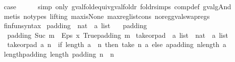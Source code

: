 \begin{isabellebody}
\ {\isacharquery}case\isanewline
\ \ \ \ \isamarkupfalse%
\ {\isacharparenleft}simp\ only{\isacharcolon}\ gval{\isacharunderscore}fold{\isacharunderscore}equiv{\isacharunderscore}gval{\isacharunderscore}foldr\ foldr{\isachardot}simps\ comp{\isacharunderscore}def\ gval{\isacharunderscore}gAnd{\isacharparenright}\isanewline
\ \ \ \ \isamarkupfalse%
\ {\isacharparenleft}metis\ {\isacharparenleft}no{\isacharunderscore}types{\isacharcomma}\ lifting{\isacharparenright}\ max{\isacharunderscore}is{\isacharunderscore}None\ max{\isacharunderscore}reg{\isacharunderscore}list{\isacharunderscore}cons\ no{\isacharunderscore}reg{\isacharunderscore}gval{\isacharunderscore}swap{\isacharunderscore}regs{\isacharparenright}\isanewline
{}\isamarkupfalse%
%
\endisatagproof
{\isafoldproof}%
%
\isadelimproof
\isanewline
%
\endisadelimproof
\isanewline
{}\isamarkupfalse%
\ finfun{\isacharunderscore}syntax\isanewline
\isanewline
{}\isamarkupfalse%
\ padding\ {\isacharcolon}{\isacharcolon}\ {\isachardoublequoteopen}nat\ {\isasymRightarrow}\ {\isacharprime}a\ list{\isachardoublequoteclose}\ \isanewline
\ \ {\isachardoublequoteopen}padding\ {}\ {\isacharequal}\ {\isacharbrackleft}{\isacharbrackright}{\isachardoublequoteclose}\ {\isacharbar}\isanewline
\ \ {\isachardoublequoteopen}padding\ {\isacharparenleft}Suc\ m{\isacharparenright}\ {\isacharequal}\ {\isacharparenleft}Eps\ {\isacharparenleft}{\isasymlambda}x{\isachardot}\ True{\isacharparenright}{\isacharparenright}{\isacharhash}{\isacharparenleft}padding\ m{\isacharparenright}{\isachardoublequoteclose}\isanewline
\isanewline
{}\isamarkupfalse%
\ take{\isacharunderscore}or{\isacharunderscore}pad\ {\isacharcolon}{\isacharcolon}\ {\isachardoublequoteopen}{\isacharprime}a\ list\ {\isasymRightarrow}\ nat\ {\isasymRightarrow}\ {\isacharprime}a\ list{\isachardoublequoteclose}\ \isanewline
\ \ {\isachardoublequoteopen}take{\isacharunderscore}or{\isacharunderscore}pad\ a\ n\ {\isacharequal}\ {\isacharparenleft}if\ length\ a\ {\isasymge}\ n\ then\ take\ n\ a\ else\ a{\isacharat}{\isacharparenleft}padding\ {\isacharparenleft}n{\isacharminus}length\ a{\isacharparenright}{\isacharparenright}{\isacharparenright}{\isachardoublequoteclose}\isanewline
\isanewline
{}\isamarkupfalse%
\ length{\isacharunderscore}padding{\isacharcolon}\ {\isachardoublequoteopen}length\ {\isacharparenleft}padding\ n{\isacharparenright}\ {\isacharequal}\ n{\isachardoublequoteclose}\isanewline
%
\isadelimproof

\end{isabellebody}
